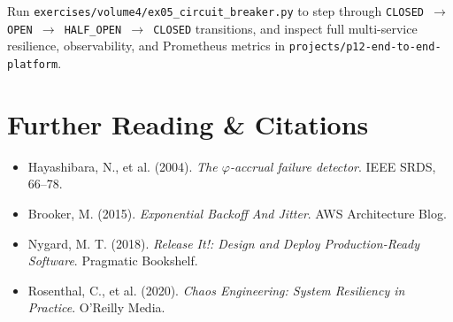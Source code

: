 \begin{labbridgebox}
Run \texttt{exercises/volume4/ex05\_circuit\_breaker.py} to step through \texttt{CLOSED $\to$ OPEN $\to$ HALF\_OPEN $\to$ CLOSED} transitions, and inspect full multi-service resilience, observability, and Prometheus metrics in \texttt{projects/p12-end-to-end-platform}.
\end{labbridgebox}

\section{Further Reading \protect\& Citations}
\begin{itemize}[leftmargin=18pt]
  \item Hayashibara, N., et al. (2004). \emph{The $\varphi$-accrual failure detector}. IEEE SRDS, 66--78.
  \item Brooker, M. (2015). \emph{Exponential Backoff And Jitter}. AWS Architecture Blog.
  \item Nygard, M. T. (2018). \emph{Release It!: Design and Deploy Production-Ready Software}. Pragmatic Bookshelf.
  \item Rosenthal, C., et al. (2020). \emph{Chaos Engineering: System Resiliency in Practice}. O'Reilly Media.
\end{itemize}
